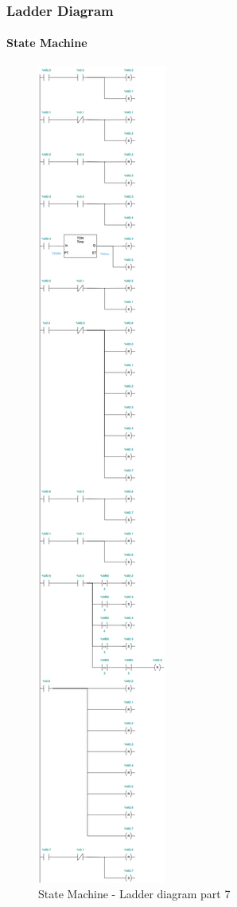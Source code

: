 \documentclass[12pt]{beamer}
\begin{document}
\begin{frame}
\frametitle{Ladder Diagram}
\framesubtitle{State Machine}
\begin{figure}
    \centering
    \includegraphics[trim={0 32cm 0 66cm}, clip, scale=.5]{img/Ladder_diagram_2.jpg}
    \caption{State Machine - Ladder diagram part 7}
    \label{fig:ladder27}
\end{figure}
\end{frame}
\end{document}
